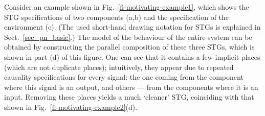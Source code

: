 Consider an example shown in Fig.~\ref{fi-motivating-example1},
which shows the STG specifications of two components (a,b) and
the specification of the environment (c). (The used short-hand
drawing notation for STGs is explained in
Sect.~\ref{sec_pn_basic}.) The model of the behaviour of the
entire system can be obtained by constructing the parallel
composition of these three STGs, which is shown in part (d) of
this figure. One can see that it contains a few implicit places
(which are not duplicate places); intuitively, they appear due
to repeated causality specifications for every signal: the one
coming from the component where this signal is an output, and
others --- from the components where it is an input. Removing
these places yields a much `cleaner' STG, coinciding with that
shown in Fig.~\ref{fi-motivating-example2}(d).

